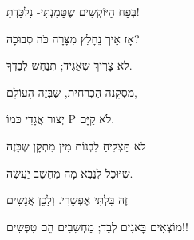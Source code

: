 בְּפַח הַיּוֹקְשִים שֶטָּמַנְתִּי- נִלְכַּדְתָּ!
\leavevmode
\newline

אָז אֵיך נֵחָלֵץ מִצָּרָה כֹּה סְבוּכָה?

לֹא צָרִיךְ שֶאַגִּיד; תְּנַחֵש לְבַדְּךָ.

מַסְקָנָה הֶכְרֵחִית, שֶבְּזֶה הָעוֹלָם,

יְצוּר אֲגָדִי כְּמוֹ P לֹא קַיָּם.
\leavevmode
\newline

לֹא תַּצְלִיחַ לִבְנוֹת מִין מִתְקָן שֶכָּזֶה

שֶיּוּכַל לְנַבֵּא מָה מַחְשֵב יַעֲשֶׂה.

זֶה בִּלְתִּי אֶפְשָרִי. וְלָכֵן אֲנָשִים

מוֹצְאִים בָּאגִים לְבַד; מַחְשֵבִים הֵם טִפְּשִים!!
\leavevmode
\newline

